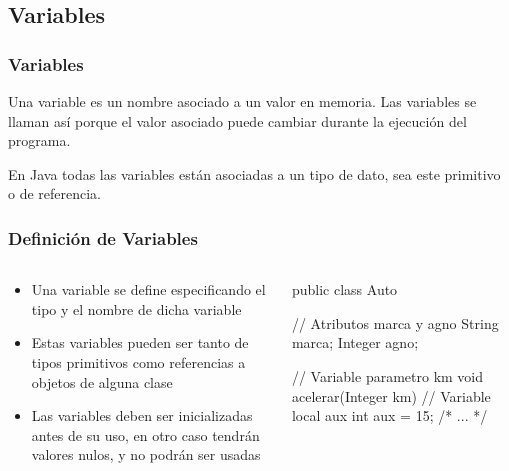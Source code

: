 \documentclass{beamer}
\begin{document}
\subsection{Variables}

\begin{frame}
  \frametitle{Variables}

  \begin{block}{}
    Una variable es un nombre asociado a un valor en memoria. Las
    variables se llaman así porque el valor asociado puede cambiar
    durante la ejecución del programa.
  \end{block}

  \begin{block}{}
    En Java todas las variables están asociadas a un tipo de dato, sea
    este primitivo o de referencia.
  \end{block}

\end{frame}

\begin{frame}[fragile]
  \frametitle{Definición de Variables} 

  \begin{columns}
    \begin{column}{0.4\textwidth}
      \begin{small}
      \begin{itemize}
      \item Una variable se define especificando el tipo y el nombre
        de dicha variable
        
      \item Estas variables pueden ser tanto de tipos primitivos como
        referencias a objetos de alguna clase
        
      \item Las variables deben ser inicializadas antes de su uso, en
        otro caso tendrán valores nulos, y no podrán ser usadas
        
      \end{itemize}
      \end{small}
    \end{column}
    \begin{column}{0.6\textwidth}
      \begin{jsmall}
        public class Auto {
          // Atributos marca y agno
          String marca;
          Integer agno;

          // Variable parametro km
          void acelerar(Integer km) {
            // Variable local aux
            int aux = 15;
            /* ... */
          }
        }        
      \end{jsmall}
    \end{column}
  \end{columns}
\end{frame}
\end{document}
